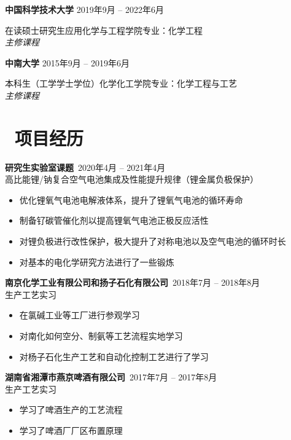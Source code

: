 \documentclass[11pt]{article}
\begin{document}
\textbf{中国科学技术大学} \hfill 2019年9月 -- 2022年6月

在读硕士研究生\quad 应用化学与工程学院\quad 专业：化学工程\\
\textit{主修课程}

\textbf{中南大学} \hfill 2015年9月 -- 2019年6月

本科生（工学学士学位）\quad 化学化工学院\quad 专业：化学工程与工艺\\
\textit{主修课程}


\section{\makebox[\widthof{\faGraduationCap}][c]{\color{CVBlue}\faUsers}\ 项目经历}

\textbf{\large{研究生实验室课题}}\  \hfill 2020年4月 -- 2021年4月\\
高比能锂/钠复合空气电池集成及性能提升规律（锂金属负极保护）

\begin{itemize}
  \item 优化锂氧气电池电解液体系，提升了锂氧气电池的循环寿命
  \item 制备钌碳管催化剂以提高锂氧气电池正极反应活性
  \item 对锂负极进行改性保护，极大提升了对称电池以及空气电池的循环时长
  \item 对基本的电化学研究方法进行了一些锻炼
\end{itemize}



\textbf{\large{南京化学工业有限公司和扬子石化有限公司}}\  \hfill \normalsize{2018年7月 -- 2018年8月}\\
生产工艺实习
\begin{itemize}
  \item 在氯碱工业等工厂进行参观学习
  \item 对南化如何空分、制氨等工艺流程实地学习
  \item 对杨子石化生产工艺和自动化控制工艺进行了学习
\end{itemize}



\textbf{\large{湖南省湘潭市燕京啤酒有限公司}}\  \hfill \normalsize{2017年7月 -- 2017年8月}\\
生产工艺实习
\begin{itemize}
  \item 学习了啤酒生产的工艺流程
  \item 学习了啤酒厂厂区布置原理
\end{itemize}
\end{document}
